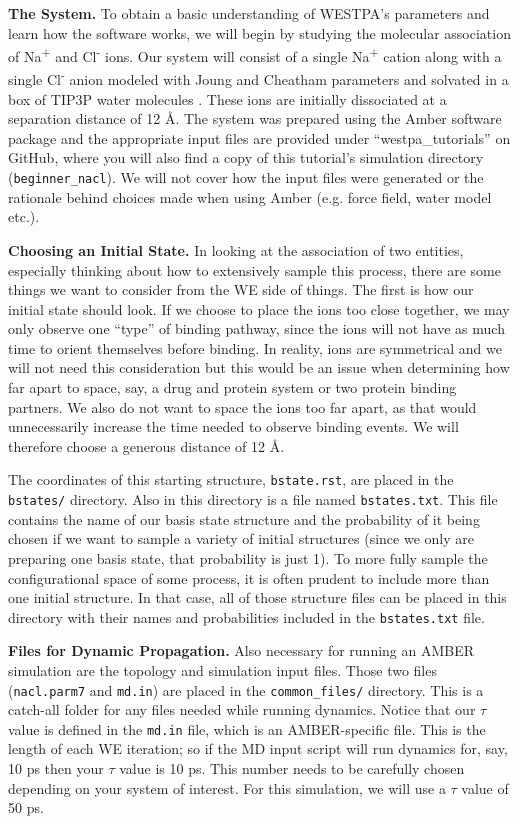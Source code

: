 \documentclass[9pt,tutorial]{livecoms}
\begin{document}
\textbf{The System.} To obtain a basic understanding of WESTPA’s parameters and learn how the software works, we will begin by studying the molecular association of Na\textsuperscript{+} and Cl\textsuperscript{-} ions. 
Our system will consist of a single Na\textsuperscript{+} cation along with a single Cl\textsuperscript{-} anion modeled with Joung and Cheatham parameters \citep{JoungCheatham2009} and solvated in a box of TIP3P water molecules \citep{tip3p}. 
These ions are initially dissociated at a separation distance of 12 \AA. 
The system was prepared using the Amber software package and the appropriate input files are provided under “westpa\_tutorials” on GitHub, where you will also find a copy of this tutorial’s simulation directory (\verb|beginner_nacl|). 
We will not cover how the input files were generated or the rationale behind choices made when using Amber (e.g. force field, water model etc.).

\textbf{Choosing an Initial State.} In looking at the association of two entities, especially thinking about how to extensively sample this process, there are some things we want to consider from the WE side of things. 
The first is how our initial state should look. If we choose to place the ions too close together, we may only observe one “type” of binding pathway, since the ions will not have as much time to orient themselves before binding. 
In reality, ions are symmetrical and we will not need this consideration but this would be an issue when determining how far apart to space, say, a drug and protein system or two protein binding partners. 
We also do not want to space the ions too far apart, as that would unnecessarily increase the time needed to observe binding events. 
We will therefore choose a generous distance of 12 \AA.

The coordinates of this starting structure, \verb|bstate.rst|, are placed in the \verb|bstates/| directory. 
Also in this directory is a file named \verb|bstates.txt|. 
This file contains the name of our basis state structure and the probability of it being chosen if we want to sample a variety of initial structures (since we only are preparing one basis state, that probability is just 1). 
To more fully sample the configurational space of some process, it is often prudent to include more than one initial structure. 
In that case, all of those structure files can be placed in this directory with their names and probabilities included in the \verb|bstates.txt| file.

\textbf{Files for Dynamic Propagation.} Also necessary for running an AMBER simulation are the topology and simulation input files. 
Those two files (\verb|nacl.parm7| and \verb|md.in|) are placed in the \verb|common_files/| directory. 
This is a catch-all folder for any files needed while running dynamics. 
Notice that our $\tau$ value is defined in the \verb|md.in| file, which is an AMBER-specific file. 
This is the length of each WE iteration; so if the MD input script will run dynamics for, say, 10 ps then your $\tau$ value is 10 ps. 
This number needs to be carefully chosen depending on your system of interest. 
For this simulation, we will use a $\tau$ value of 50 ps. 
\end{document}
